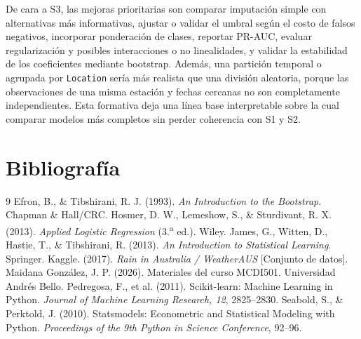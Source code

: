 \documentclass[11pt,a4paper]{article}
\begin{document}
De cara a S3, las mejoras prioritarias son comparar imputación simple con alternativas más informativas, ajustar o validar el umbral según el costo de falsos negativos, incorporar ponderación de clases, reportar PR-AUC, evaluar regularización y posibles interacciones o no linealidades, y validar la estabilidad de los coeficientes mediante bootstrap. Además, una partición temporal o agrupada por \texttt{Location} sería más realista que una división aleatoria, porque las observaciones de una misma estación y fechas cercanas no son completamente independientes. Esta formativa deja una línea base interpretable sobre la cual comparar modelos más completos sin perder coherencia con S1 y S2.

\clearpage
\section{Bibliografía}
\begin{thebibliography}{9}
 Efron, B., \& Tibshirani, R. J. (1993). \textit{An Introduction to the Bootstrap}. Chapman \& Hall/CRC.
 Hosmer, D. W., Lemeshow, S., \& Sturdivant, R. X. (2013). \textit{Applied Logistic Regression} (3.\textsuperscript{a} ed.). Wiley.
 James, G., Witten, D., Hastie, T., \& Tibshirani, R. (2013). \textit{An Introduction to Statistical Learning}. Springer.
 Kaggle. (2017). \textit{Rain in Australia / WeatherAUS} [Conjunto de datos].
 Maidana González, J. P. (2026). Materiales del curso MCDI501. Universidad Andrés Bello.
 Pedregosa, F., et al. (2011). Scikit-learn: Machine Learning in Python. \textit{Journal of Machine Learning Research, 12}, 2825--2830.
 Seabold, S., \& Perktold, J. (2010). Statsmodels: Econometric and Statistical Modeling with Python. \textit{Proceedings of the 9th Python in Science Conference}, 92--96.
\end{thebibliography}
\end{document}
